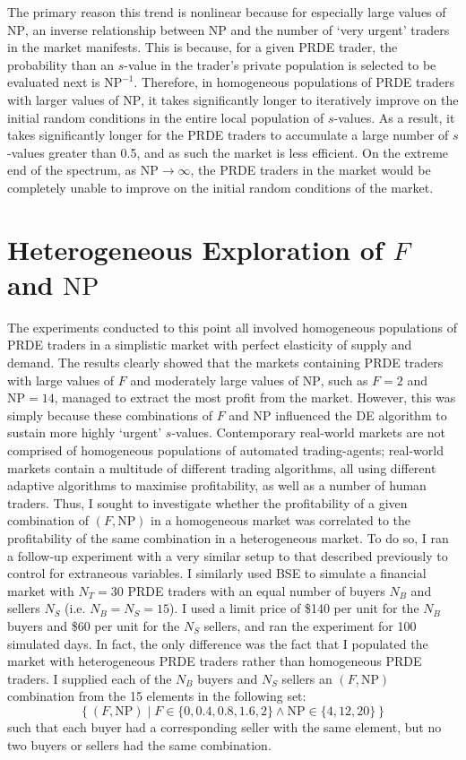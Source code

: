 \documentclass[conference]{IEEEtran}
\begin{document}
The primary reason this trend is nonlinear because for especially large values of $\mathrm{NP}$, an inverse relationship between $\mathrm{NP}$ and the number of `very urgent' traders in the market manifests.
This is because, for a given PRDE trader, the probability than an $s$-value in the trader's private population is selected to be evaluated next is $\mathrm{NP}^{-1}$.
Therefore, in homogeneous populations of PRDE traders with larger values of $\mathrm{NP}$, it takes significantly longer to iteratively improve on the initial random conditions in the entire local population of $s$-values.
As a result, it takes significantly longer for the PRDE traders to accumulate a large number of $s$-values greater than 0.5, and as such the market is less efficient.
On the extreme end of the spectrum, as $\mathrm{NP}\to\infty$, the PRDE traders in the market would be completely unable to improve on the initial random conditions of the market.

\section{Heterogeneous Exploration of $F$ and $\mathrm{NP}$}

The experiments conducted to this point all involved homogeneous populations of PRDE traders in a simplistic market with perfect elasticity of supply and demand.
The results clearly showed that the markets containing PRDE traders with large values of $F$ and moderately large values of $\mathrm{NP}$, such as $F=2$ and $\mathrm{NP}=14$, managed to extract the most profit from the market.
However, this was simply because these combinations of $F$ and $\mathrm{NP}$ influenced the DE algorithm to sustain more highly `urgent' $s$-values.
Contemporary real-world markets are not comprised of homogeneous populations of automated trading-agents; real-world markets contain a multitude of different trading algorithms, all using different adaptive algorithms to maximise profitability, as well as a number of human traders.
Thus, I sought to investigate whether the profitability of a given combination of $(F, \mathrm{NP})$ in a homogeneous market was correlated to the profitability of the same combination in a heterogeneous market.
To do so, I ran a follow-up experiment with a very similar setup to that described previously to control for extraneous variables.
I similarly used BSE to simulate a financial market with $N_T=30$ PRDE traders with an equal number of buyers $N_B$ and sellers $N_S$ (i.e. $N_B=N_S=15$).
I used a limit price of \$140 per unit for the $N_B$ buyers and \$60 per unit for the $N_S$ sellers, and ran the experiment for 100 simulated days.
In fact, the only difference was the fact that I populated the market with heterogeneous PRDE traders rather than homogeneous PRDE traders.
I supplied each of the $N_B$ buyers and $N_S$ sellers an $(F,\mathrm{NP})$ combination from the 15 elements in the following set:
\[
  \left\{ (F, \mathrm{NP}) \mid F\in\{0, 0.4, 0.8, 1.6, 2\} \land \mathrm{NP} \in \{4, 12, 20 \} \right\}
\]
such that each buyer had a corresponding seller with the same element, but no two buyers or sellers had the same combination.
\end{document}
